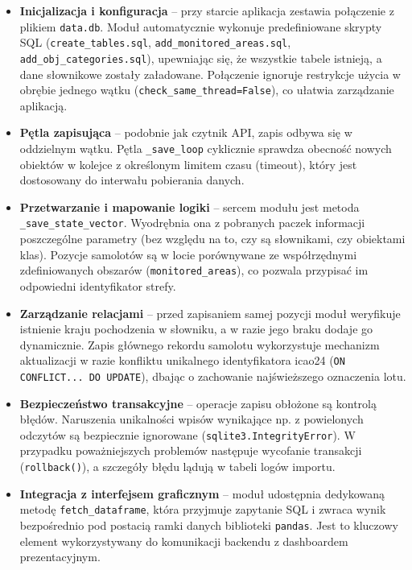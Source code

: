 \documentclass[12pt,a4paper]{article}
\begin{document}
\begin{itemize}
    \item \textbf{Inicjalizacja i konfiguracja} – przy starcie aplikacja zestawia połączenie z plikiem \texttt{data.db}. Moduł automatycznie wykonuje predefiniowane skrypty SQL (\texttt{create\_tables.sql}, \texttt{add\_monitored\_areas.sql}, \texttt{add\_obj\_categories.sql}), upewniając się, że wszystkie tabele istnieją, a dane słownikowe zostały załadowane. Połączenie ignoruje restrykcje użycia w obrębie jednego wątku (\texttt{check\_same\_thread=False}), co ułatwia zarządzanie aplikacją.
    \item \textbf{Pętla zapisująca} – podobnie jak czytnik API, zapis odbywa się w oddzielnym wątku. Pętla \texttt{\_save\_loop} cyklicznie sprawdza obecność nowych obiektów w kolejce z określonym limitem czasu (timeout), który jest dostosowany do interwału pobierania danych.
    \item \textbf{Przetwarzanie i mapowanie logiki} – sercem modułu jest metoda \texttt{\_save\_state\_vector}. Wyodrębnia ona z pobranych paczek informacji poszczególne parametry (bez względu na to, czy są słownikami, czy obiektami klas). Pozycje samolotów są w locie porównywane ze współrzędnymi zdefiniowanych obszarów (\texttt{monitored\_areas}), co pozwala przypisać im odpowiedni identyfikator strefy.
    \item \textbf{Zarządzanie relacjami} – przed zapisaniem samej pozycji moduł weryfikuje istnienie kraju pochodzenia w słowniku, a w razie jego braku dodaje go dynamicznie. Zapis głównego rekordu samolotu wykorzystuje mechanizm aktualizacji w razie konfliktu unikalnego identyfikatora icao24 (\texttt{ON CONFLICT... DO UPDATE}), dbając o zachowanie najświeższego oznaczenia lotu.
    \item \textbf{Bezpieczeństwo transakcyjne} – operacje zapisu obłożone są kontrolą błędów. Naruszenia unikalności wpisów wynikające np. z powielonych odczytów są bezpiecznie ignorowane (\texttt{sqlite3.IntegrityError}). W przypadku poważniejszych problemów następuje wycofanie transakcji (\texttt{rollback()}), a szczegóły błędu lądują w tabeli logów importu.
    \item \textbf{Integracja z interfejsem graficznym} – moduł udostępnia dedykowaną metodę \texttt{fetch\_dataframe}, która przyjmuje zapytanie SQL i zwraca wynik bezpośrednio pod postacią ramki danych biblioteki \texttt{pandas}. Jest to kluczowy element wykorzystywany do komunikacji backendu z dashboardem prezentacyjnym.
\end{itemize}
\end{document}
